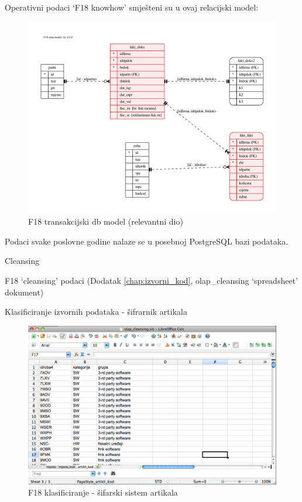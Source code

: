 \documentclass[times, utf8, seminar]{fit}
\begin{document}
Operativni podaci `F18 knowhow' smješteni su u ovaj relacijski model:

\begin{figure}[H]
\centering
\includegraphics[width=15cm]{img/F18_db.pdf}
\caption{F18 transakcijski db model (relevantni dio)}
\end{figure}

Podaci svake poslovne godine nalaze se u posebnoj PostgreSQL bazi podataka.

Cleansing

F18 `cleansing' podaci  (Dodatak \ref{chap:izvorni_kod}, olap\_cleansing `spreadsheet' dokument)

Klasificiranje izvornih podataka - šifrarnik artikala

\begin{figure}[H]
\centering
\includegraphics[width=15cm]{img/clean_artikli.png}
\caption{F18 klasificiranje - šifarski sistem artikala}
\end{figure}
\end{document}
